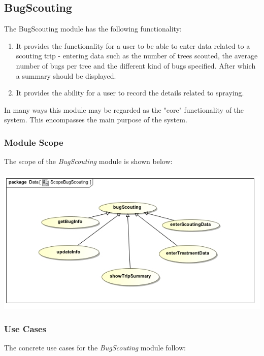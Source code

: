 \documentclass[11pt,a4paper,titlepage]{article}
\begin{document}
	\subsection{BugScouting}
		The BugScouting module has the following functionality:
		\begin{enumerate}
			\item It provides the functionality for a user to be able to enter data related to a scouting trip - entering data such as the number of trees scouted, the average number of bugs per tree and the different kind of bugs specified. After which a summary should be displayed.
			\item It provides the ability for a user to record the details related to spraying.
		\end{enumerate}

		In many ways this module may be regarded as the "core" functionality of the system. This encompasses the main purpose of the system.
		\subsubsection{Module Scope}
		The scope of the \textit{BugScouting} module is shown below:\\
		\hfill\\
		\includegraphics[width=\linewidth]{ScopeBugScouting}
		
		\subsubsection{Use Cases}
		The concrete use cases for the \textit{BugScouting} module follow:
\end{document}
